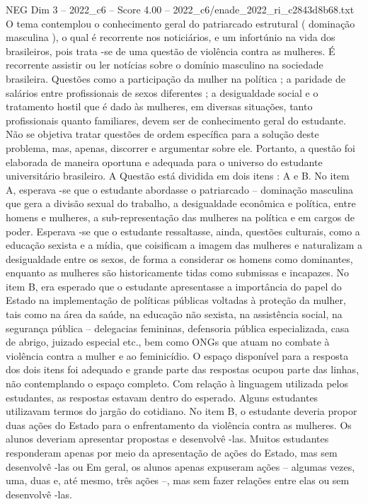 \begin{textsample}{NEG Dim 3 – 2022\_c6 – Score 4.00 – 2022\_c6/enade\_2022\_ri\_c2843d8b68.txt}
O tema contemplou o conhecimento geral do patriarcado estrutural ( dominação masculina ), o qual é recorrente nos noticiários, e um infortúnio na vida dos brasileiros, pois trata -se de uma questão de violência contra as mulheres.
É recorrente assistir ou ler notícias sobre o domínio masculino na sociedade brasileira.
Questões como a participação da mulher na política ; a paridade de salários entre profissionais de sexos diferentes ; a desigualdade social e o tratamento hostil que é dado às mulheres, em diversas situações, tanto profissionais quanto familiares, devem ser de conhecimento geral do estudante.
Não se objetiva tratar questões de ordem específica para a solução deste problema, mas, apenas, discorrer e argumentar sobre ele.
Portanto, a questão foi elaborada de maneira oportuna e adequada para o universo do estudante universitário brasileiro.
A Questão está dividida em dois itens : A e B.
No item A, esperava -se que o estudante abordasse o patriarcado – dominação masculina que gera a divisão sexual do trabalho, a desigualdade econômica e política, entre homens e mulheres, a sub-representação das mulheres na política e em cargos de poder.
Esperava -se que o estudante ressaltasse, ainda, questões culturais, como a educação sexista e a mídia, que coisificam a imagem das mulheres e naturalizam a desigualdade entre os sexos, de forma a considerar os homens como dominantes, enquanto as mulheres são historicamente tidas como submissas e incapazes.
No item B, era esperado que o estudante apresentasse a importância do papel do Estado na implementação de políticas públicas voltadas à proteção da mulher, tais como na área da saúde, na educação não sexista, na assistência social, na segurança pública – delegacias femininas, defensoria pública especializada, casa de abrigo, juizado especial etc., bem como ONGs que atuam no combate à violência contra a mulher e ao feminicídio.
O espaço disponível para a resposta dos dois itens foi adequado e grande parte das respostas ocupou parte das linhas, não contemplando o espaço completo.
Com relação à linguagem utilizada pelos estudantes, as respostas estavam dentro do esperado.
Alguns estudantes utilizavam termos do jargão do cotidiano.
No item B, o estudante deveria propor duas ações do Estado para o enfrentamento da violência contra as mulheres.
Os alunos deveriam apresentar propostas e desenvolvê -las.
Muitos estudantes responderam apenas por meio da apresentação de ações do Estado, mas sem desenvolvê -las ou Em geral, os alunos apenas expuseram ações – algumas vezes, uma, duas e, até mesmo, três ações –, mas sem fazer relações entre elas ou sem desenvolvê -las.

\end{textsample}
